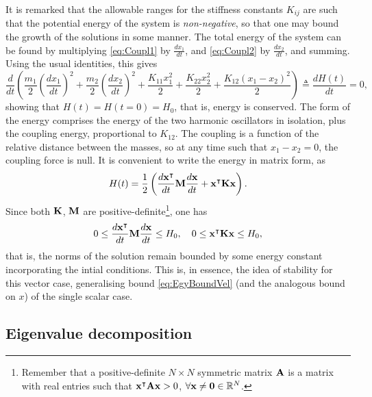 It is remarked that the allowable ranges for the stiffness constants $K_{ij}$ are such that the potential energy of the system  is \emph{non-negative}, so that one may bound the growth of the solutions in some manner. The total energy of the system can be found by multiplying \eqref{eq:Coupl1} by $\frac{dx_1}{dt}$, and \eqref{eq:Coupl2} by $\frac{dx_2}{dt}$, and summing. Using the usual identities, this gives
\begin{equation}\label{eq:EnBalCnt2Masses}
\frac{d}{dt}\left( \frac{m_1}{2}\left( \frac{dx_1}{dt} \right)^2 + \frac{m_2}{2}\left( \frac{dx_2}{dt} \right)^2 + \frac{K_{11} x_1^2}{2} +  \frac{K_{22} x_2^2}{2} + \frac{K_{12} (x_1-x_2)^2}{2}\right) \triangleq \frac{dH(t)}{dt} = 0,
\end{equation}
showing that $H(t) = H(t=0) = H_0$, that is, energy is conserved. The form of the energy comprises the energy of the two harmonic oscillators in isolation, plus the coupling energy, proportional to $K_{12}$. The coupling is a function of the relative distance between the masses, so at any time such that $x_1-x_2=0$, the coupling force is null. It is convenient to write the energy in matrix form, as
\begin{equation}
H(t) = \frac{1}{2}\left(\frac{d{\bf x}^\intercal}{dt} {\bf M} \frac{d{\bf x}}{dt} + {\bf x}^\intercal {\bf K} {\bf x}\right).
\end{equation}
Since both ${\bf K}$, ${\bf M}$ are positive-definite\footnote{Remember that a positive-definite $N\times N$ symmetric matrix ${\bf A}$ is a matrix with real entries such that ${\bf x}^\intercal {\bf A} {\bf x} > 0$, $\forall {\bf x} \neq {\bf 0} \in \mathbb{R}^N$. }, one has
\begin{equation}
0 \leq \frac{d{\bf x}^\intercal}{dt} {\bf M} \frac{d{\bf x}}{dt} \leq H_0, \quad 0 \leq {\bf x}^\intercal {\bf K} {\bf x} \leq H_0,
\end{equation}
that is, the norms of the solution remain bounded by some energy constant incorporating the intial conditions. This is, in essence, the idea of stability for this vector case, generalising  bound \eqref{eq:EgyBoundVel} (and the analogous bound on $x$) of the single scalar case. 

\subsection{Eigenvalue decomposition}


